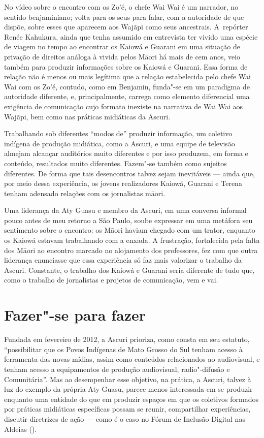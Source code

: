 No vídeo sobre o encontro com os Zo’é, o chefe Wai Wai é um narrador, no
sentido benjaminiano; volta para os seus para falar, com a autoridade de que dispõe, sobre esses que aparecem aos Wajãpi como seus
ancestrais. A~repórter Renée Kahukura, ainda que tenha assumido em
entrevista ter vivido uma espécie de viagem no tempo ao encontrar os
Kaiowá e Guarani em uma situação de privação de direitos análoga à
vivida pelos M\=aori há mais de cem anos, veio também para produzir
informações sobre os Kaiowá e Guarani. Essa forma de relação não é
menos ou mais legítima que a relação estabelecida pelo chefe Wai Wai
com os Zo’é, contudo, como em Benjamin, funda"-se em um paradigma de
autoridade diferente, e, principalmente, carrega como elemento
diferencial uma exigência de comunicação cujo formato inexiste na
narrativa de Wai Wai aos Wajãpi, bem como nas práticas midiáticas da
Ascuri.

Trabalhando sob diferentes ``modos de'' produzir informação, um coletivo
indígena de produção midiática, como a Ascuri, e uma equipe de
televisão almejam alcançar auditórios muito diferentes e por isso
produzem, em forma e conteúdo, resultados muito diferentes. Fazem"-se
também como sujeitos diferentes. De forma que tais desencontros talvez
sejam inevitáveis --- ainda que, por meio dessa experiência, os jovens
realizadores Kaiowá, Guarani e Terena tenham adensado relações com os
jornalistas m\=aori.

Uma liderança da Aty Guasu e membro da Ascuri, em uma conversa informal
pouco antes de meu retorno a São Paulo, soube expressar em uma metáfora
seu sentimento sobre o encontro: os M\=aori haviam chegado com um
trator, enquanto os Kaiowá estavam trabalhando com a enxada. A
frustração, fortalecida pela falta dos M\=aori ao encontro marcado no
alojamento dos professores, fez com que outra liderança enunciasse que
essa experiência só faz mais valorizar o trabalho da Ascuri. Constante,
o trabalho dos Kaiowá e Guarani seria diferente de tudo que, como o
trabalho de jornalistas e projetos de comunicação, vem e vai.

\section{Fazer"-se para fazer}

Fundada em fevereiro de 2012, a Ascuri prioriza, como consta em seu
estatuto, ``possibilitar que os Povos Indígenas de Mato
Grosso do Sul tenham acesso à ferramenta das novas mídias, assim como
conteúdos relacionados ao audiovisual, e tenham acesso a equipamentos
de produção audiovisual, radio"-difusão e  Comunitária''.
Mas ao desempenhar esse objetivo, na prática, a Ascuri, talvez à luz do
exemplo da própria Aty Guasu, parece menos interessada em se produzir
enquanto uma entidade do que em produzir espaços em que os coletivos
formados por práticas midiáticas específicas possam se reunir,
compartilhar experiências, discutir diretrizes de ação --- como é o caso
no Fórum de Inclusão Digital nas Aldeias ().

